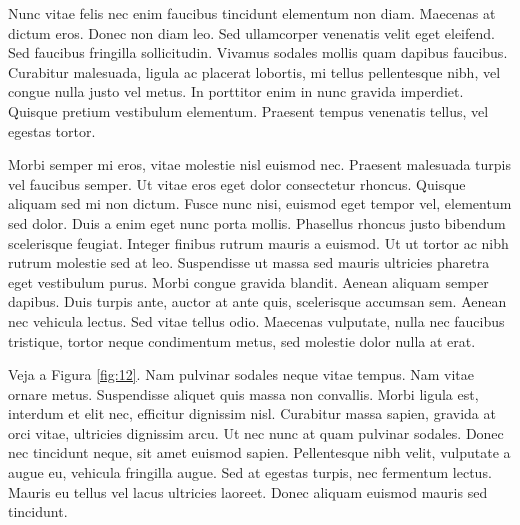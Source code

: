 \begin{btUnit}
Nunc vitae felis nec enim faucibus tincidunt elementum non diam.
Maecenas at dictum eros. Donec non diam leo. Sed ullamcorper venenatis
velit eget eleifend. Sed faucibus fringilla sollicitudin. Vivamus
sodales mollis quam dapibus faucibus. Curabitur malesuada, ligula ac
placerat lobortis, mi tellus pellentesque nibh, vel congue nulla justo
vel metus. In porttitor enim in nunc gravida imperdiet. Quisque
pretium vestibulum elementum. Praesent tempus venenatis tellus, vel
egestas tortor.

Morbi semper mi eros, vitae molestie nisl euismod nec. Praesent
malesuada turpis vel faucibus semper. Ut vitae eros eget dolor
consectetur rhoncus. Quisque aliquam sed mi non dictum. Fusce nunc
nisi, euismod eget tempor vel, elementum sed dolor. Duis a enim eget
nunc porta mollis. Phasellus rhoncus justo bibendum scelerisque
feugiat. Integer finibus rutrum mauris a euismod. Ut ut tortor ac nibh
rutrum molestie sed at leo. Suspendisse ut massa sed mauris ultricies
pharetra eget vestibulum purus. Morbi congue gravida blandit. Aenean
aliquam semper dapibus. Duis turpis ante, auctor at ante quis,
scelerisque accumsan sem. Aenean nec vehicula lectus. Sed vitae tellus
odio. Maecenas vulputate, nulla nec faucibus tristique, tortor neque
condimentum metus, sed molestie dolor nulla at erat.

Veja a Figura \ref{fig:12}. Nam pulvinar sodales neque vitae tempus.
Nam vitae ornare metus. Suspendisse aliquet quis massa non convallis.
Morbi ligula est, interdum et elit nec, efficitur dignissim nisl.
Curabitur massa sapien, gravida at orci vitae, ultricies dignissim arcu.
Ut nec nunc at quam pulvinar sodales. Donec nec tincidunt neque, sit
amet euismod sapien. Pellentesque nibh velit, vulputate a augue eu,
vehicula fringilla augue. Sed at egestas turpis, nec fermentum lectus.
Mauris eu tellus vel lacus ultricies laoreet. Donec aliquam euismod
mauris sed tincidunt.


\end{btUnit}
